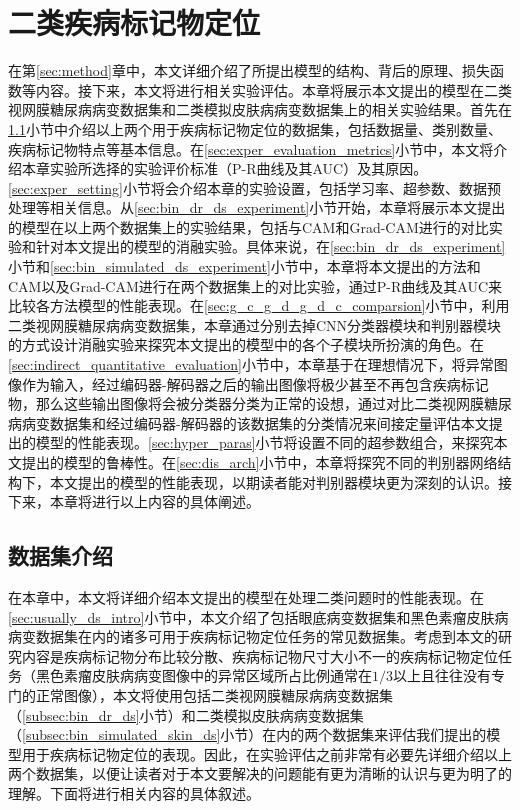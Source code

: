 \chapter{二类疾病标记物定位}\label{sec:experiments}
在第\ref{sec:method}章中，本文详细介绍了所提出模型的结构、背后的原理、损失函数等内容。接下来，本文将进行相关实验评估。本章将展示本文提出的模型在二类视网膜糖尿病病变数据集和二类模拟皮肤病病变数据集上的相关实验结果。首先在\ref{sec:exper_ds_intro}小节中介绍以上两个用于疾病标记物定位的数据集，包括数据量、类别数量、疾病标记物特点等基本信息。在\ref{sec:exper_evaluation_metrics}小节中，本文将介绍本章实验所选择的实验评价标准（P-R曲线及其AUC）及其原因。\ref{sec:exper_setting}小节将会介绍本章的实验设置，包括学习率、超参数、数据预处理等相关信息。从\ref{sec:bin_dr_ds_experiment}小节开始，本章将展示本文提出的模型在以上两个数据集上的实验结果，包括与CAM和Grad-CAM进行的对比实验和针对本文提出的模型的消融实验。具体来说，在\ref{sec:bin_dr_ds_experiment}小节和\ref{sec:bin_simulated_ds_experiment}小节中，本章将本文提出的方法和CAM以及Grad-CAM进行在两个数据集上的对比实验，通过P-R曲线及其AUC来比较各方法模型的性能表现。在\ref{sec:g_c_g_d_g_d_c_comparsion}小节中，利用二类视网膜糖尿病病变数据集，本章通过分别去掉CNN分类器模块和判别器模块的方式设计消融实验来探究本文提出的模型中的各个子模块所扮演的角色。在\ref{sec:indirect_quantitative_evaluation}小节中，本章基于在理想情况下，将异常图像作为输入，经过编码器-解码器之后的输出图像将极少甚至不再包含疾病标记物，那么这些输出图像将会被分类器分类为正常的设想，通过对比二类视网膜糖尿病病变数据集和经过编码器-解码器的该数据集的分类情况来间接定量评估本文提出的模型的性能表现。\ref{sec:hyper_paras}小节将设置不同的超参数组合，来探究本文提出的模型的鲁棒性。在\ref{sec:dis_arch}小节中，本章将探究不同的判别器网络结构下，本文提出的模型的性能表现，以期读者能对判别器模块更为深刻的认识。接下来，本章将进行以上内容的具体阐述。
\section{数据集介绍}\label{sec:exper_ds_intro}
在本章中，本文将详细介绍本文提出的模型在处理二类问题时的性能表现。在\ref{sec:usually_ds_intro}小节中，本文介绍了包括眼底病变数据集和黑色素瘤皮肤病病变数据集在内的诸多可用于疾病标记物定位任务的常见数据集。考虑到本文的研究内容是疾病标记物分布比较分散、疾病标记物尺寸大小不一的疾病标记物定位任务（黑色素瘤皮肤病病变图像中的异常区域所占比例通常在$1/3$以上且往往没有专门的正常图像），本文将使用包括二类视网膜糖尿病病变数据集（\ref{subsec:bin_dr_ds}小节）和二类模拟皮肤病病变数据集（\ref{subsec:bin_simulated_skin_ds}小节）在内的两个数据集来评估我们提出的模型用于疾病标记物定位的表现。因此，在实验评估之前非常有必要先详细介绍以上两个数据集，以便让读者对于本文要解决的问题能有更为清晰的认识与更为明了的理解。下面将进行相关内容的具体叙述。
